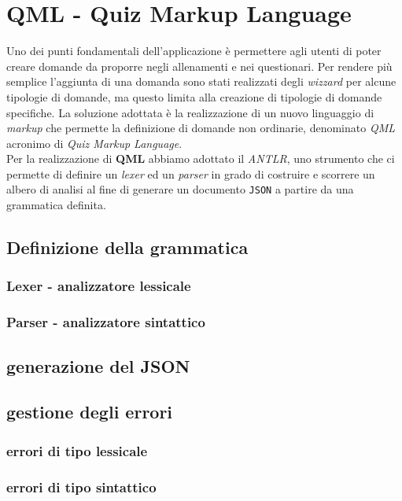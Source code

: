 \newpage
\section{QML - Quiz Markup Language}
Uno dei punti fondamentali dell'applicazione è permettere agli utenti di poter creare domande da proporre negli allenamenti e nei questionari. Per rendere più semplice l'aggiunta di una domanda sono stati realizzati degli \textit{wizzard} per alcune tipologie di domande, ma questo limita alla creazione di tipologie di domande specifiche. La soluzione adottata è la realizzazione di un nuovo linguaggio di \textit{markup} che permette la definizione di domande non ordinarie, denominato \textit{QML} acronimo di \textit{Quiz Markup Language}. \\
Per la realizzazione di \textbf{QML} abbiamo adottato il \textit{ANTLR}, uno strumento che ci permette di definire un \textit{lexer} ed un \textit{parser} in grado di costruire e scorrere un albero di analisi al fine di generare un documento \texttt{JSON} a partire da una grammatica definita.

\subsection{Definizione della grammatica}
\subsubsection{Lexer - analizzatore lessicale}
\subsubsection{Parser - analizzatore sintattico}
\subsection{generazione del JSON}
\subsection{gestione degli errori}
\subsubsection{errori di tipo lessicale}
\subsubsection{errori di tipo sintattico}
